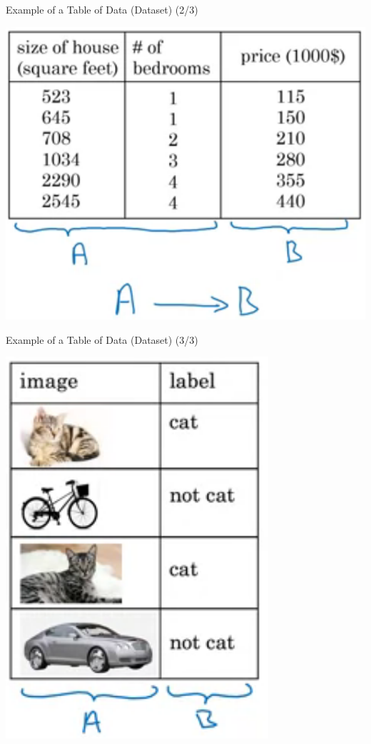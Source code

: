 \documentclass[pdf]{beamer}
\theoremstyle{mystyle}
\begin{document}
\begin{frame}{Example of a Table of Data (Dataset) (2/3)}
	\begin{table}[!ht]
		\centering
		\includegraphics[scale=.3]{example-dataset-1}
		\caption{House prices dataset~\citep{ng2019AIForEveryone}}
		\label{fig:example-dataset-1}
	\end{table}
\end{frame}

\begin{frame}{Example of a Table of Data (Dataset) (3/3)}
	\begin{table}[!ht]
		\centering
		\includegraphics[scale=.3]{example-dataset-3}
		\caption{Cat images dataset~\citep{ng2019AIForEveryone}}
		\label{fig:example-dataset-3}
	\end{table}
\end{frame}
\end{document}
